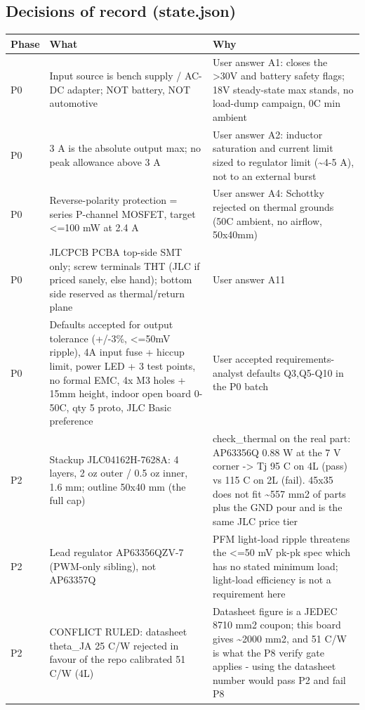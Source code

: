 \documentclass[11pt,a4paper]{article}
\begin{document}
\subsection*{Decisions of record (state.json)}
{\small
\begin{longtable}{lp{5.2cm}p{7.2cm}}
\toprule
\textbf{Phase} & \textbf{What} & \textbf{Why} \\
\midrule
\endhead
P0 & Input source is bench supply / AC-DC adapter; NOT battery, NOT automotive & User answer A1: closes the \textgreater{}30V and battery safety flags; 18V steady-state max stands, no load-dump campaign, 0C min ambient \\
P0 & 3 A is the absolute output max; no peak allowance above 3 A & User answer A2: inductor saturation and current limit sized to regulator limit (\textasciitilde{}4-5 A), not to an external burst \\
P0 & Reverse-polarity protection = series P-channel MOSFET, target \textless{}=100 mW at 2.4 A & User answer A4: Schottky rejected on thermal grounds (50C ambient, no airflow, 50x40mm) \\
P0 & JLCPCB PCBA top-side SMT only; screw terminals THT (JLC if priced sanely, else hand); bottom side reserved as thermal/return plane & User answer A11 \\
P0 & Defaults accepted for output tolerance (+/-3\%, \textless{}=50mV ripple), 4A input fuse + hiccup limit, power LED + 3 test points, no formal EMC, 4x M3 holes + 15mm height, indoor open board 0-50C, qty 5 proto, JLC Basic preference & User accepted requirements-analyst defaults Q3,Q5-Q10 in the P0 batch \\
P2 & Stackup JLC04162H-7628A: 4 layers, 2 oz outer / 0.5 oz inner, 1.6 mm; outline 50x40 mm (the full cap) & check\_thermal on the real part: AP63356Q 0.88 W at the 7 V corner -\textgreater{} Tj 95 C on 4L (pass) vs 115 C on 2L (fail). 45x35 does not fit \textasciitilde{}557 mm2 of parts plus the GND pour and is the same JLC price tier \\
P2 & Lead regulator AP63356QZV-7 (PWM-only sibling), not AP63357Q & PFM light-load ripple threatens the \textless{}=50 mV pk-pk spec which has no stated minimum load; light-load efficiency is not a requirement here \\
P2 & CONFLICT RULED: datasheet theta\_JA 25 C/W rejected in favour of the repo calibrated 51 C/W (4L) & Datasheet figure is a JEDEC 8710 mm2 coupon; this board gives \textasciitilde{}2000 mm2, and 51 C/W is what the P8 verify gate applies - using the datasheet number would pass P2 and fail P8 \\

\end{longtable}}
\end{document}
